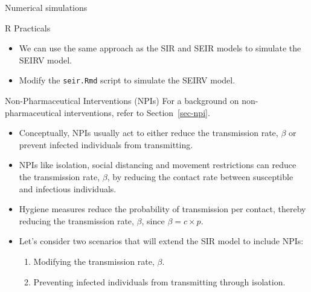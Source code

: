 \documentclass[
  ignorenonframetext,
]{beamer}
\providecommand{\tightlist}{%
  \setlength{\itemsep}{0pt}\setlength{\parskip}{0pt}}\usepackage{longtable,booktabs,array}
\begin{document}
\begin{frame}[fragile]
\begin{block}{Numerical simulations}
\label{numerical-simulations-2}
\begin{block}{R Practicals}
\label{r-practicals-1}
\begin{itemize}
\item
  We can use the same approach as the SIR and SEIR models to simulate
  the SEIRV model.
\item
  Modify the \texttt{seir.Rmd} script to simulate the SEIRV model.
\end{itemize}
\end{block}
\end{block}
\end{frame}

\begin{frame}
\begin{block}{Non-Pharmaceutical Interventions (NPIs)}
\label{non-pharmaceutical-interventions-npis}
For a background on non-pharmaceutical interventions, refer to
Section~\ref{sec-npi}.
\end{block}
\end{frame}

\begin{frame}
\begin{itemize}
\item
  Conceptually, NPIs usually act to either reduce the transmission rate,
  \(\beta\) or prevent infected individuals from transmitting.
\item
  NPIs like isolation, social distancing and movement restrictions can
  reduce the transmission rate, \(\beta\), by reducing the contact rate
  between susceptible and infectious individuals.
\item
  Hygiene measures reduce the probability of transmission per contact,
  thereby reducing the transmission rate, \(\beta\), since
  \(\beta = c \times p\).
\end{itemize}
\end{frame}

\begin{frame}
\begin{itemize}
\item
  Let's consider two scenarios that will extend the SIR model to include
  NPIs:

  \begin{enumerate}
  \tightlist
  \item
    Modifying the transmission rate, \(\beta\).
  \item
    Preventing infected individuals from transmitting through isolation.
  \end{enumerate}
\end{itemize}
\end{frame}
\end{document}
